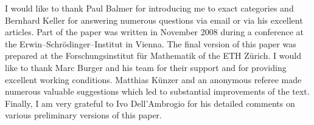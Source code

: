 \documentclass[1p]{elsarticle}
\theoremstyle{mythm}
\theoremstyle{mydef}
\begin{document}
I would like to thank Paul Balmer for introducing me to exact categories
and Bernhard Keller for answering numerous questions via email or via his
excellent articles. Part of the paper was written
in November 2008 during a conference at the Erwin--Schr\"odinger--Institut
in Vienna. The final version of this paper was prepared at the
Forschungsinstitut f\"ur Mathematik of the ETH Z\"urich. I would like
to thank Marc Burger and his team for their support and for
providing excellent working conditions. 
Matthias K\"unzer and an anonymous referee
made numerous valuable suggestions which led to substantial
improvements of the text. 
Finally, I am very grateful to Ivo Dell'Ambrogio for his
detailed comments on various preliminary versions of this paper.






\end{document}
